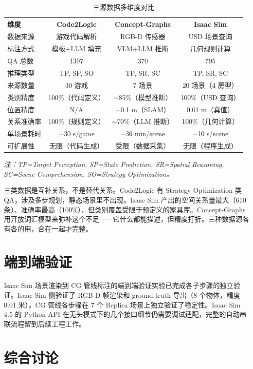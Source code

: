 \begin{table}[H]
\centering
\caption{三源数据多维度对比}
\label{tab:three_source}
\begin{tabular}{lccc}
\toprule
\textbf{维度} & \textbf{Code2Logic} & \textbf{Concept-Graphs} & \textbf{Isaac Sim} \\
\midrule
数据来源 & 游戏代码解析 & RGB-D 传感器 & USD 场景查询 \\
标注方式 & 模板+LLM 填充 & VLM+LLM 推断 & 几何规则计算 \\
QA 总数 & 1397 & 370 & 795 \\
推理类型 & TP, SP, SO & TP, SR, SC & TP, SR, SC \\
来源数量 & 30 游戏 & 7 场景 & 20 场景（4 房型） \\
类别精度 & 100\%（代码定义） & $\sim$85\%（模型推断） & 100\%（USD 查询） \\
位置精度 & N/A & $\sim$0.1 m（SLAM） & 0.01 m（真值） \\
关系准确率 & 100\%（规则定义） & $\sim$70\%（LLM 推断） & 100\%（几何计算） \\
单场景耗时 & $\sim$30 s/game & $\sim$36 min/scene & $\sim$10 s/scene \\
可扩展性 & 无限（代码生成） & 受限（数据采集） & 无限（程序生成） \\
\bottomrule
\end{tabular}
\end{table}

\textit{注：TP=Target Perception, SP=State Prediction, SR=Spatial Reasoning, SC=Scene Comprehension, SO=Strategy Optimization。}

三类数据是互补关系，不是替代关系。Code2Logic 有 Strategy Optimization 类 QA，涉及多步规划，静态场景里不出现。Isaac Sim 产出的空间关系量最大（610 条）、准确率最高（100\%），但类别覆盖受限于预定义的家具库。Concept-Graphs 用开放词汇模型来弥补这个不足——它什么都能描述，但精度打折。三种数据源各有各的用，合在一起才完整。

\section{端到端验证}

Isaac Sim 场景渲染到 CG 管线标注的端到端验证实验已完成各子步骤的独立验证。Isaac Sim 侧验证了 RGB-D 帧渲染和 ground truth 导出（8 个物体，精度 0.01 米）。CG 管线各步骤在 7 个 Replica 场景上独立验证了稳定性。Isaac Sim 4.5 的 Python API 在无头模式下的几个接口细节仍需要调试适配，完整的自动串联流程留到后续工程工作。

\section{综合讨论}

